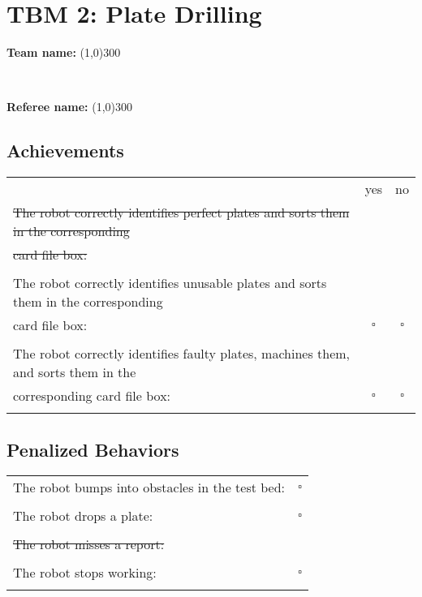 \section*{TBM 2: Plate Drilling}
\vspace{0.5cm} \begin{large} \textbf{Team name:} \line(1,0){300} \end{large} \vspace{0.7cm} \\ 
\vspace{0.5cm} \begin{large} \textbf{Referee name:} \line(1,0){300} \end{large} \vspace{0.2cm}

\subsection*{Achievements}
\begin{tabular}{ l c c}
 & yes & no \\
\st{The robot correctly identifies perfect plates and sorts them in the corresponding} & &  \\
\st{card file box:} & &  \\ \\

The robot correctly identifies unusable plates and sorts them in the corresponding & &  \\
card file box: & $\square$ & $\square$ \\ \\

The robot correctly identifies faulty plates, machines them, and sorts them in the & &  \\
corresponding card file box: & $\square$ & $\square$ \\ \\
\end{tabular}

\subsection*{Penalized Behaviors}
\begin{tabular}{ l c}
The robot bumps into obstacles in the test bed: & $\square$ \\ \\
The robot drops a plate: & $\square$ \\ \\
\st{The robot misses a report:} & \\ \\
The robot stops working: & $\square$ \\ \\
\end{tabular}

